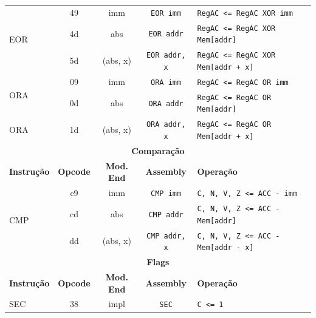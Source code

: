 \documentclass[
	12pt,				  %
	openright,		%
	a4paper,			%
	english,			%
	french,				%
	spanish,			%
	brazil,				%
]{abntex2}
\newcommand{\codenobg}[1]{\texttt{#1}}
\begin{document}
\begin{center}
\begin{longtable}{|l|c|c|c|p{7cm}|}
		\multirow{3}{*}{EOR} & 49              & imm               & \codenobg{EOR imm}     & \codenobg{RegAC <= RegAC XOR imm}                \\ \cline{2-5}
		                     & 4d              & abs               & \codenobg{EOR addr}    & \codenobg{RegAC <= RegAC XOR Mem[addr]}          \\ \cline{2-5}
		                     & 5d              & (abs, x)          & \codenobg{EOR addr, x} & \codenobg{RegAC <= RegAC XOR Mem[addr + x]}      \\ \hline
		\multirow{2}{*}{ORA} & 09              & imm               & \codenobg{ORA imm}     & \codenobg{RegAC <= RegAC OR imm}                 \\ \cline{2-5}
		                     & 0d              & abs               & \codenobg{ORA addr}    & \codenobg{RegAC <= RegAC OR Mem[addr]}           \\ \hline
		\multirow{1}{*}{ORA} & 1d              & (abs, x)          & \codenobg{ORA addr, x} & \codenobg{RegAC <= RegAC OR Mem[addr + x]}       \\ \hline
		\multicolumn{5}{|c|}{\textbf{Comparação}}                                                                                              \\ \hline
		\textbf{Instrução}   & \textbf{Opcode} & \textbf{Mod. End} & \textbf{Assembly}      & \textbf{Operação}                                \\ \hline
		\multirow{3}{*}{CMP} & c9              & imm               & \codenobg{CMP imm}     & \codenobg{C, N, V, Z <= ACC - imm }              \\ \cline{2-5}
		                     & cd              & abs               & \codenobg{CMP addr}    & \codenobg{C, N, V, Z <= ACC - Mem[addr] }        \\ \cline{2-5}
		                     & dd              & (abs, x)          & \codenobg{CMP addr, x} & \codenobg{C, N, V, Z <= ACC - Mem[addr - x] }    \\ \hline
		\multicolumn{5}{|c|}{\textbf{Flags}}                                                                                                   \\ \hline
		\textbf{Instrução}   & \textbf{Opcode} & \textbf{Mod. End} & \textbf{Assembly}      & \textbf{Operação}                                \\ \hline
		\multirow{1}{*}{SEC} & 38              & impl              & \codenobg{SEC}         & \codenobg{C <= 1}                                \\ \hline

\end{longtable}
\end{center}
\end{document}
